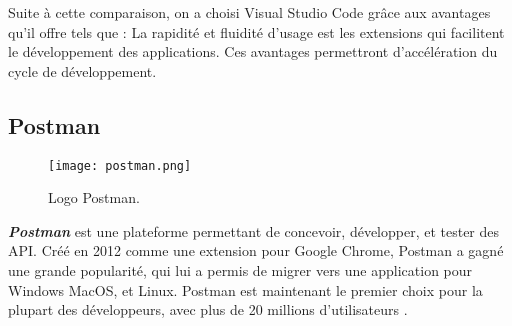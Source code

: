 Suite à cette comparaison, on a choisi Visual Studio Code grâce aux avantages qu'il offre tels que : La rapidité et fluidité d'usage est les extensions qui facilitent le développement des applications. Ces avantages permettront d'accélération du cycle de développement.
\subsection{Postman}
\begin{figure}[H]
    \centering
    \texttt{[image: postman.png]}
    \vspace{1cm}
    \captionsetup{justification=centering}
    \caption{Logo Postman.}
    \label{fig:postman_logo}
\end{figure}
\textit{\textbf{Postman}} \cite{postman} est une plateforme permettant de concevoir, développer, et tester des API. Créé en 2012 comme une extension pour Google Chrome, Postman a gagné une grande popularité, qui lui a permis de migrer vers une application pour Windows MacOS, et Linux. Postman est maintenant le premier choix pour la plupart des développeurs, avec plus de 20 millions d'utilisateurs \cite{postman_users}.
